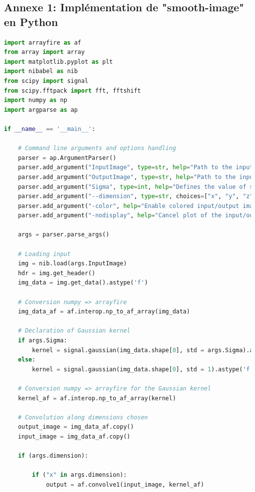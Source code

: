 \documentclass[10pt]{report}
\begin{document}
\begin{appendix}
	\chapter*{Annexe 1: Implémentation de "smooth-image" en Python}
	\begin{lstlisting}[language=python]
import arrayfire as af
from array import array
import matplotlib.pyplot as plt
import nibabel as nib 
from scipy import signal
from scipy.fftpack import fft, fftshift 
import numpy as np
import argparse as ap

if __name__ == '__main__':
	
	# Command line arguments and options handling 
	parser = ap.ArgumentParser()
	parser.add_argument("InputImage", type=str, help="Path to the input image")
	parser.add_argument("OutputImage", type=str, help="Path to the input image")
	parser.add_argument("Sigma", type=int, help="Defines the value of sigma for the Gaussian kernel. Default: 1")
	parser.add_argument("--dimension", type=str, choices=["x", "y", "z", "xy", "yz", "xz", "xyz"], help="Specifies on which dimensions execute the blurring. Default: xyz")
	parser.add_argument("-color", help="Enable colored input/output image plot.", action="store_false")
	parser.add_argument("-nodisplay", help="Cancel plot of the input/output images. Has priority over \"-color argument\".", action="store_false")
	
	args = parser.parse_args()
	
	# Loading input
	img = nib.load(args.InputImage)
	hdr = img.get_header()
	img_data = img.get_data().astype('f')
	
	# Conversion numpy => arrayfire
	img_data_af = af.interop.np_to_af_array(img_data)
	
	# Declaration of Gaussian kernel
	if args.Sigma:
		kernel = signal.gaussian(img_data.shape[0], std = args.Sigma).astype('f')
	else:
		kernel = signal.gaussian(img_data.shape[0], std = 1).astype('f')
	
	# Conversion numpy => arrayfire for the Gaussian kernel
	kernel_af = af.interop.np_to_af_array(kernel)
	
	# Convolution along dimensions chosen 
	output_image = img_data_af.copy()
	input_image = img_data_af.copy()
	
	if (args.dimension):
	
		if ("x" in args.dimension):
			output = af.convolve1(input_image, kernel_af)
		

\end{lstlisting}
\end{appendix}
\end{document}
